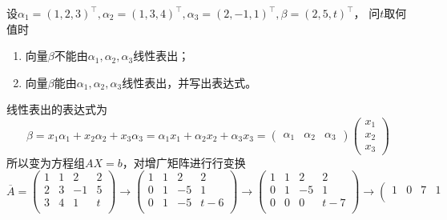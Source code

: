 \begin{example}
    设$\alpha_1 = (1,2,3)^\intercal,\alpha_2 = (1,3,4)^\intercal, \alpha_3 = (2,-1,1)^\intercal,\beta = (2,5,t)^\intercal$，
    问$t$取何值时
    \begin{enumerate}[(1)]
        \item 向量$\beta$不能由$\alpha_1,\alpha_2,\alpha_3$线性表出；
        \item 向量$\beta$能由$\alpha_1,\alpha_2,\alpha_3$线性表出，并写出表达式。
    \end{enumerate}
\end{example}
\begin{solution}
    线性表出的表达式为
    \[
        \beta = x_1\alpha_1 + x_2 \alpha_2 + x_3\alpha_3
        = \alpha_1x_1 + \alpha_2x_2 + \alpha_3x_3
        =
        \begin{pmatrix}
            \alpha_1 & \alpha_2 & \alpha_3
        \end{pmatrix}
        \begin{pmatrix}
            x_1 \\x_2\\x_3
        \end{pmatrix}
    \]
    所以变为方程组$AX=b$，对增广矩阵进行行变换
    \[
        \overline{A}=
        \left(\begin{array}{ccc|c}
                1 & 1 & 2  & 2 \\
                2 & 3 & -1 & 5 \\
                3 & 4 & 1  & t \\
            \end{array}\right)
        \longrightarrow
        \left(\begin{array}{ccc|c}
                1 & 1 & 2  & 2   \\
                0 & 1 & -5 & 1   \\
                0 & 1 & -5 & t-6 \\
            \end{array}\right)
        \longrightarrow
        \left(\begin{array}{ccc|c}
                1 & 1 & 2  & 2   \\
                0 & 1 & -5 & 1   \\
                0 & 0 & 0  & t-7 \\
            \end{array}\right)
        \longrightarrow
        \left(\begin{array}{ccc|c}
                1 & 0 & 7  & 1   \\

\end{array}\]
\end{solution}
